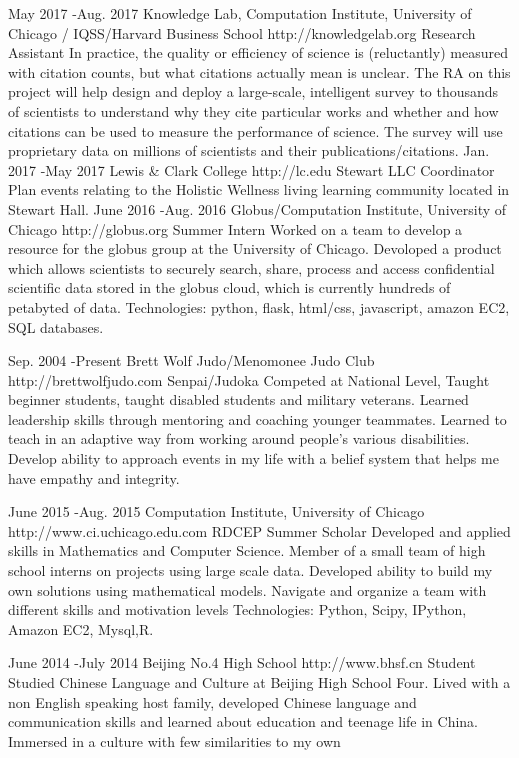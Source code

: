 \documentclass[10pt]{article} %
\begin{document}
\job
{May 2017 -}{Aug. 2017}
{Knowledge Lab, Computation Institute, University of Chicago / IQSS/Harvard Business School}
{http://knowledgelab.org}
{Research Assistant}
{In practice, the quality or efficiency of science is (reluctantly) measured with citation counts, but what citations actually mean is unclear. The RA on this project will help design and deploy a large-scale, intelligent survey to thousands of scientists to understand why they cite particular works and whether and how citations can be used to measure the performance of science. The survey will use proprietary data on millions of scientists and their publications/citations.}
\job
{Jan. 2017 -}{May 2017}
{Lewis \& Clark College}
{http://lc.edu}
{Stewart LLC Coordinator}
{Plan events relating to the Holistic Wellness living learning community located in Stewart Hall.}
\job
{June 2016 -}{Aug. 2016}
{Globus/Computation Institute, University of Chicago}
{http://globus.org}
{Summer Intern}
{Worked on a team to develop a resource for the globus group at the University of Chicago. Devoloped a product which allows scientists to securely search, share, process and access confidential scientific data stored in the globus cloud, which is currently hundreds of petabyted of data.}
{Technologies: python, flask, html/css, javascript, amazon EC2, SQL databases.}

\job
{Sep. 2004 -}{Present}
{Brett Wolf Judo/Menomonee Judo Club}
{http://brettwolfjudo.com}
{Senpai/Judoka}
{Competed at National Level, Taught beginner students, taught disabled students and military veterans. Learned leadership skills through mentoring and coaching younger teammates.  Learned to teach in an adaptive way from working around people’s various disabilities.  Develop ability to approach events in my life with a belief system that helps me have empathy and integrity.}

\job
{June 2015 -}{Aug. 2015}
{Computation Institute, University of Chicago}
{http://www.ci.uchicago.edu.com}
{RDCEP Summer Scholar}
{Developed and applied skills in Mathematics and Computer Science. Member of a small team of high school interns on projects using large scale data.   Developed ability to build my own solutions using mathematical models.  Navigate and organize a team with different skills and motivation levels}
{Technologies: Python, Scipy, IPython, Amazon EC2, Mysql,R.}



\job
{June 2014 -}{July 2014}
{Beijing No.4 High School}
{http://www.bhsf.cn}
{Student}
{Studied Chinese Language and Culture at Beijing High School Four. Lived with a non English speaking host family, developed Chinese language and communication skills and learned about education and teenage life in China.  Immersed in a culture with few similarities to my own}
\end{document}
